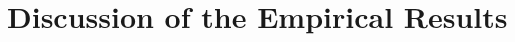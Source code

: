\section{Discussion of the Empirical Results}
\label{sec:results-discussion}


\begin{comment}
\begin{landscape}
	\begin{table}[ht]
		\centering
		\begin{tabular}{l|lll|lll|lll|lll|}
			\multirow{3}{*}{Original CVRP Instance} & \multicolumn{6}{c|}{scaled 1.0} & \multicolumn{6}{c|}{scaled 2.0}                                                                                                                \\
			\cmidrule{2-7}
			                                        & \multicolumn{3}{c|}{libRCSP}    & \multicolumn{3}{c|}{BAC MIP}    & \multicolumn{3}{c|}{libRCSP} & \multicolumn{3}{c|}{BAC MIP}                                                  \\
			                                        & UB                              & LB                              & T [s]                        & UB                           & LB & T [s] & UB & LB & T [s] & UB & LB & T [s] \\
			\toprule
			A-n37                                   & x0                              & y0                              & t0                           & x1                           & y1 & t1    & x0 & y0 & t0    & x1 & y1 & t1    \\
			A-n38                                   & x2                              & y2                              & t2                           & x3                           & y3 & t3    & x2 & y2 & t2    & x3 & y3 & t3    \\
			\bottomrule
		\end{tabular}
	\end{table}
\end{landscape}

\end{comment}

\begin{comment}
\mytodo{Include the F-n135 grep result to talk about the difficulty of this instance and related ones}
\end{comment}
